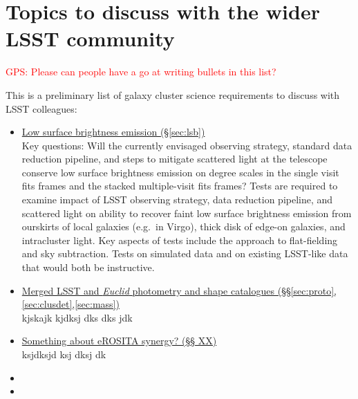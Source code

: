 \documentclass[a4paper,11pt]{article}
\newcommand{\red}{\textcolor{red}}
\begin{document}
\section{Topics to discuss with the wider LSST community}

\red{GPS: Please can people have a go at writing bullets in this
  list?}

\noindent This is a preliminary list of galaxy cluster science
requirements to discuss with LSST colleagues:
\begin{itemize}
\item\underline{Low surface brightness emission
  (\S\ref{sec:lsb})}\smallskip\\Key questions: Will the currently
  envisaged observing strategy, standard data reduction pipeline, and
  steps to mitigate scattered light at the telescope conserve low
  surface brightness emission on degree scales in the single visit
  fits frames and the stacked multiple-visit fits frames?  Tests are
  required to examine impact of LSST observing strategy, data
  reduction pipeline, and scattered light on ability to recover faint
  low surface brightness emission from ourskirts of local galaxies
  (e.g.\ in Virgo), thick disk of edge-on galaxies, and intracluster
  light.  Key aspects of tests include the approach to flat-fielding
  and sky subtraction.  Tests on simulated data and on existing
  LSST-like data that would both be instructive.
\item\underline{Merged LSST and \emph{Euclid} photometry and shape
  catalogues
  (\S\S\ref{sec:proto},\ref{sec:clusdet},\ref{sec:mass})}\smallskip\\kjskajk
  kjdksj dks dks jdk
\item\underline{Something about eROSITA synergy? (\S\S
  XX)}\smallskip\\ksjdksjd ksj dksj dk
\item
\item
\end{itemize}


\end{document}
